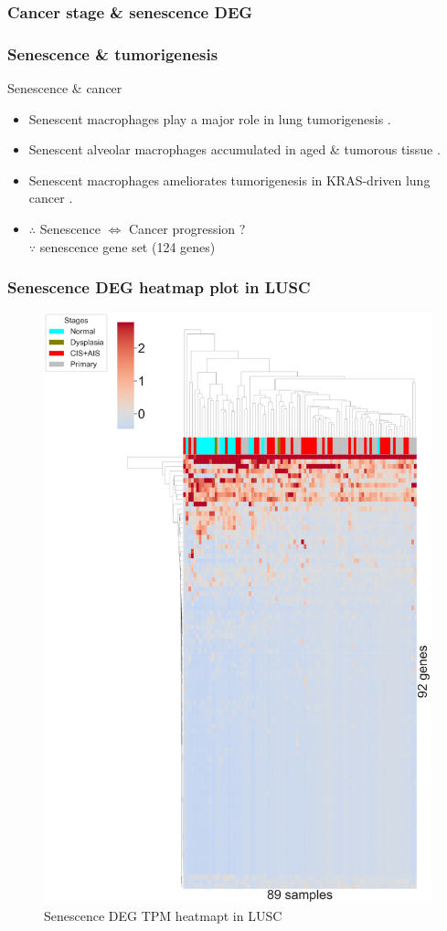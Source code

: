 \documentclass{beamer}
\begin{document}
            \subsubsection{Cancer stage \& senescence DEG}
                \begin{frame}
                    \frametitle{Senescence \& tumorigenesis}

                    \begin{block}{Senescence \& cancer}
                        \begin{itemize}
                            \item Senescent macrophages play a major role in lung tumorigenesis \cite{senescent-01}.
                            \item Senescent alveolar macrophages accumulated in aged \& tumorous tissue \cite{senescent-02}.
                            \item Senescent macrophages ameliorates tumorigenesis in KRAS-driven lung cancer \cite{senescent-03}.
                            \item $\therefore$ Senescence $\Leftrightarrow$ Cancer progression ? \\
                                $\because$ senescence gene set (124 genes) \cite{senescent-04}
                        \end{itemize}
                    \end{block}
                \end{frame}

                \begin{frame}
                    \frametitle{Senescence DEG heatmap plot in LUSC}

                    \begin{figure}
                        \includegraphics[width=0.3 \linewidth]{figures/DEG/Cluster/STAR.TPM.SQC.senescence.pdf}
                        \caption{Senescence DEG TPM heatmapt in LUSC}
                    \end{figure}
                \end{frame}
\end{document}
